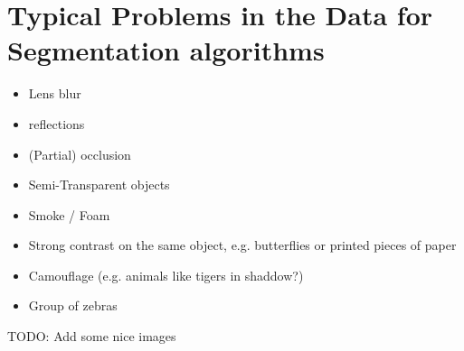 \section{Typical Problems in the Data for Segmentation algorithms}

\begin{itemize}
    \item Lens blur
    \item reflections
    \item (Partial) occlusion
    \item Semi-Transparent objects
    \item Smoke / Foam
    \item Strong contrast on the same object, e.g. butterflies or printed
          pieces of paper
    \item Camouflage (e.g. animals like tigers in shaddow?)
    \item Group of zebras
\end{itemize}

TODO: Add some nice images
